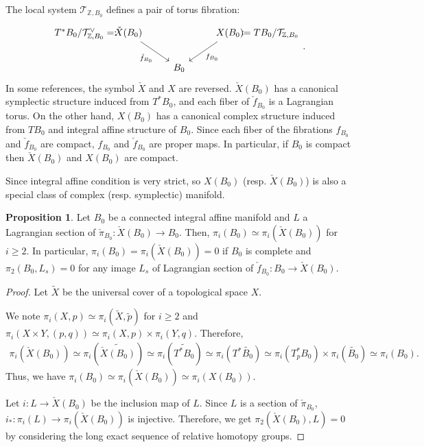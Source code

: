 \documentclass[a4paper,dvipdfmx,reqno,12pt]{amsart}
\theoremstyle{definition}
\newtheorem{proposition}[theorem]{Proposition}
\newcommand{\deq}{\coloneqq}
\newcommand{\Z}{\mathbb{Z}}%
\numberwithin{equation}{section}
\begin{document}
The local system $\mathcal{T}_{\mathbb{Z}, B_0}$ defines 
 a pair of torus fibration:
\begin{equation} \label{definition-SYZ-torus-fibration}
\begin{tikzcd}%
T^{*}B_0/\mathcal{T}_{\Z , B_0}^{\vee} =:\hspace{-35pt} 
&\check{X}(B_0) \arrow[rd,"\check{f}_{B_0}"'] 
&   & X(B_0) \arrow[ld,"f_{B_0}"] 
&\hspace{-35pt} \deq TB_0/\mathcal{T}_{\Z, B_0} \\
& &  B_0 & &
\end{tikzcd}.
\end{equation}
In some references, the symbol $\check{X}$ and
$X$ are reversed. 
$\check{X}(B_0)$ has a canonical symplectic structure 
induced from $T^{*}B_0$, and each fiber of 
$\check{f}_{B_0}$ is a Lagrangian torus.
On the other hand, $X(B_0)$ has a canonical complex
structure induced from $TB_0$ and integral affine 
structure of $B_0$.
Since each fiber of the fibrations $f_{B_0}$ and 
$\check{f}_{B_0}$ are compact,
$f_{B_0}$ and $\check{f}_{B_0}$ are proper maps.
In particular, if $B_0$ is compact then 
$\check{X}(B_0)$ and $X(B_0)$ are compact.

Since integral affine condition is very strict, so 
$X(B_0)$ (resp. $\check{X}(B_0)$) is also a special class of complex (resp. symplectic) manifold.

\begin{proposition}

\label{proposition-unobstructed-lagrangian}
Let $B_0$ be a connected integral affine manifold 
and $L$ a Lagrangian section of 
$\check{\pi}_{B_0}\colon \check{X}(B_0)\to B_0$. 
Then, $\pi_i(B_0)\simeq \pi_i(\check{X}(B_0))$ 
for $i\geq 2$.
In particular, 
$\pi_i(B_0)=\pi_i(\check{X}(B_0))=0$ if 
$B_0$ is complete and $\pi_2(B_0,L_s)=0$ for any image
$L_s$ of 
Lagrangian section of $\check{f}_{B_0}\colon B_0 \to \check{X}(B_0)$.
\end{proposition}
\begin{proof}
Let $\widetilde{X}$ be the universal cover of 
a topological space $X$.


We note $\pi_{i}(X,p)\simeq 
\pi_{i}(\widetilde{X},\tilde{p})$ for $i\geq 2$ and 
$\pi_{i}(X\times Y,(p,q))\simeq \pi_i(X,p)
\times \pi_i(Y,q)$. Therefore,
\begin{align}
\pi_{i}(\check{X}(B_0))\simeq 
\pi_{i}(\widetilde{\check{X}(B_0)})\simeq 
\pi_{i}(\widetilde{T^{*}B_0})\simeq 
\pi_{i}(T^{*}\widetilde{B_0})\simeq 
\pi_{i}(T_p^* B_0)\times \pi_{i}(\widetilde{B_0})\simeq 
\pi_{i}(B_0).
\end{align}
Thus, we have 
$\pi_{i}(B_0)\simeq \pi_{i}(\check{X}(B_0))\simeq 
\pi_{i}(X(B_0))$. 

Let $i\colon L\to \check{X}(B_0)$ be the inclusion map of 
$L$.
Since $L$ is a section of 
$\check{\pi}_{B_0}$, 
$i_*\colon \pi_i(L)\to \pi_i(\check{X}(B_0))$ is 
injective. Therefore, we get 
$\pi_2(\check{X}(B_0),L)=0$ by considering the long exact
sequence of relative homotopy groups.
\end{proof}
\end{document}
